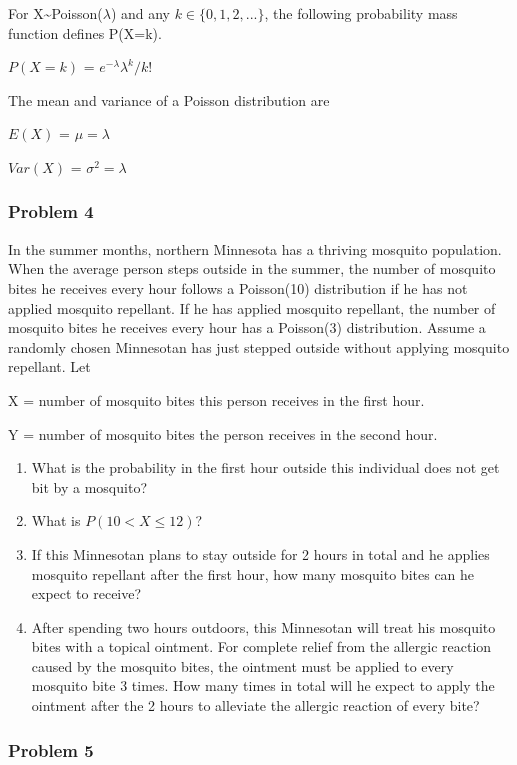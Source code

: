 \documentclass[]{article}
\begin{document}
For X\textasciitilde Poisson(\(\lambda\)) and any \(k\in\{0,1,2,...\}\),
the following probability mass function defines P(X=k).

\(P(X=k)\) = \(e^{-\lambda}\lambda^{k}/k!\)

The mean and variance of a Poisson distribution are

\(E(X)\) = \(\mu = \lambda\)

\(Var(X)\) = \(\sigma^2 = \lambda\)

\hypertarget{problem-4}{%
\subsubsection{Problem 4}\label{problem-4}}

In the summer months, northern Minnesota has a thriving mosquito
population. When the average person steps outside in the summer, the
number of mosquito bites he receives every hour follows a Poisson(10)
distribution if he has not applied mosquito repellant. If he has applied
mosquito repellant, the number of mosquito bites he receives every hour
has a Poisson(3) distribution. Assume a randomly chosen Minnesotan has
just stepped outside without applying mosquito repellant. Let

X = number of mosquito bites this person receives in the first hour.

Y = number of mosquito bites the person receives in the second hour.

\begin{enumerate}
\def\labelenumi{\alph{enumi})}
\item
  What is the probability in the first hour outside this individual does
  not get bit by a mosquito?
\item
  What is \(P(10<X \leq 12)\)?
\item
  If this Minnesotan plans to stay outside for 2 hours in total and he
  applies mosquito repellant after the first hour, how many mosquito
  bites can he expect to receive?
\item
  After spending two hours outdoors, this Minnesotan will treat his
  mosquito bites with a topical ointment. For complete relief from the
  allergic reaction caused by the mosquito bites, the ointment must be
  applied to every mosquito bite 3 times. How many times in total will
  he expect to apply the ointment after the 2 hours to alleviate the
  allergic reaction of every bite?
\end{enumerate}

\hypertarget{problem-5}{%
\subsubsection{Problem 5}\label{problem-5}}
\end{document}
